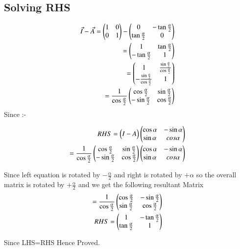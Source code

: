 \documentclass[journal,12pt,onecolumn]{IEEEtran}
\begin{document}
\subsection{Solving RHS}
\begin{align}
   \Vec{I}-\Vec{A}=\begin{pmatrix}1 & 0\\ 0 & 1\end{pmatrix}-\begin{pmatrix}0 & - \tan\frac{\alpha}{2} \\ \tan\frac{\alpha}{2} & 0 \end{pmatrix}\\
   =\begin{pmatrix}1 &  \tan\frac{\alpha}{2} \\ -\tan\frac{\alpha}{2} & 1 \end{pmatrix}\\
   =\begin{pmatrix}1 & \frac{\sin\frac{\alpha}{2}}{\cos\frac{\alpha}{2}}\\ -\frac{\sin\frac{\alpha}{2}}{\cos\frac{\alpha}{2}} & 1\end{pmatrix}\\
   =\frac{1}{\cos\frac{\alpha}{2}}\begin{pmatrix}\cos\frac{\alpha}{2} & \sin\frac{\alpha}{2} \\ -\sin\frac{\alpha}{2} & \cos\frac{\alpha}{2}\end{pmatrix}
\end{align}
Since :-

\begin{align}
 RHS=\begin{pmatrix}I-A\end{pmatrix}\begin{pmatrix}\cos\alpha & -\sin\alpha \\ \sin\alpha & cos\alpha\end{pmatrix}\\
 =\frac{1}{\cos\frac{\alpha}{2}}\begin{pmatrix}\cos\frac{\alpha}{2} & \sin\frac{\alpha}{2} \\ -\sin\frac{\alpha}{2} & \cos\frac{\alpha}{2}\end{pmatrix}\begin{pmatrix}\cos\alpha & -\sin\alpha \\ \sin\alpha & cos\alpha\end{pmatrix}
\end{align}

Since left equation is rotated by $-\frac{\alpha}{2}$ and right is rotated  by $+\alpha$ so the overall matrix is rotated by $+\frac{\alpha}{2}$ and we get the following resultant Matrix
\begin{align}
  =\frac{1}{\cos\frac{\alpha}{2}}\begin{pmatrix}\cos\frac{\alpha}{2} & -\sin\frac{\alpha}{2} \\ \sin\frac{\alpha}{2} & \cos\frac{\alpha}{2}\end{pmatrix}\\
  RHS=\begin{pmatrix}1 &  -\tan\frac{\alpha}{2} \\ \tan\frac{\alpha}{2} & 1 \end{pmatrix}
\end{align}

Since LHS=RHS Hence Proved.
\end{document}
